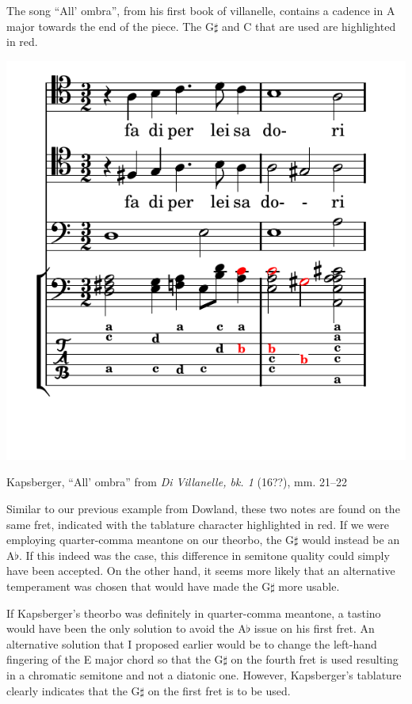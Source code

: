 The song ``All' ombra'', from his first book of villanelle, contains a cadence in A major
towards the end of the piece. The G$\sharp$ and C that are used are highlighted in red.
\begin{example}[h]
\centering
\includegraphics[trim=0 0.5in 0 0,clip=true]{examples/kaps_ombria.pdf}
\label{kaps-ombria}
\caption{Kapsberger, ``All' ombra'' from \textit{Di Villanelle, bk. 1} (16??), mm. 21--22 }
\end{example}
Similar to our previous example from Dowland, these two notes are found on the
same fret, indicated with the tablature character  highlighted in red.
If we were employing quarter-comma meantone on our theorbo, the G$\sharp$ would
instead be an A$\flat$. If this indeed was the case, this difference in semitone
quality could simply have been accepted. On the other hand, it seems more
likely that an alternative temperament was chosen that would have made the
G$\sharp$ more usable.

If Kapsberger's theorbo was definitely in quarter-comma meantone, a tastino would have been the only solution to avoid
the A$\flat$ issue on his first fret. An alternative solution that I proposed earlier would be to change the left-hand
fingering of the E major chord so that the G$\sharp$ on the fourth fret is used resulting in a chromatic semitone and
not a diatonic one. However, Kapsberger's tablature clearly indicates that the G$\sharp$ on the first fret is to be
used.

